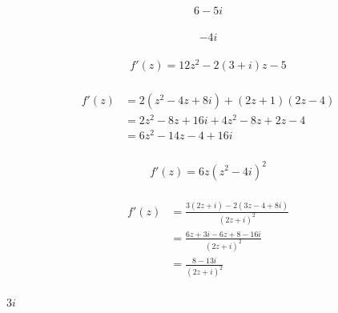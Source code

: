 \documentclass{article}
\begin{document}
\[6 - 5 i\]

\setcounter{subsubsection}{20}
\subsubsection{}

\[-4 i\]

\setcounter{subsubsection}{26}
\subsubsection{}

\[f'(z) = 12 z^2 - 2 (3 + i) z - 5\]

\setcounter{subsubsection}{28}
\subsubsection{}

\begin{align*}
  f'(z) & = 2 (z^2 - 4 z + 8 i) + (2 z + 1) (2 z - 4)  \\
        & = 2 z^2 - 8 z + 16 i + 4 z^2 - 8 z + 2 z - 4 \\
        & = 6 z^2 - 14 z - 4 + 16 i
\end{align*}

\setcounter{subsubsection}{30}
\subsubsection{}

\[f'(z) = 6 z (z^2 - 4 i)^2\]

\setcounter{subsubsection}{32}
\subsubsection{}

\begin{align*}
  f'(z) & = \frac{3 (2 z + i) - 2 (3 z - 4 + 8 i)}{(2 z + i)^2} \\
        & = \frac{6 z + 3 i - 6 z + 8 - 16 i}{(2 z + i)^2}      \\
        & = \frac{8 - 13 i}{(2 z + i)^2}
\end{align*}

\setcounter{subsubsection}{34}
\subsubsection{}

$3 i$

\setcounter{subsubsection}{36}
\end{document}
